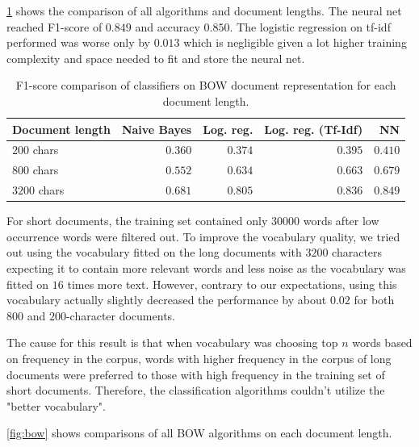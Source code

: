 \cref{tbl:bow_comparison} shows the comparison of all algorithms and document lengths. The neural net reached F1-score of $0.849$ and accuracy $0.850$. The logistic regression on tf-idf performed was worse only by $0.013$ which is negligible given a lot higher training complexity and space needed to fit and store the neural net.

\begin{table}[h]
	\centering
	\begin{tabular}{|l|r|r|r|r|}\hline
		Document length & Naive Bayes & Log. reg. & Log. reg. (Tf-Idf) & NN \\
		\hline
		$200$ chars   & $ 0.360$  &  $0.374$  & $0.395$  &  $0.410$   \\
		$800$ chars   & $0.552$  &  $0.634$  & $0.663$  &  $0.679$   \\
		$3200$ chars  & $0.681$  &  $0.805$  & $0.836$  &  $0.849$   \\
		\hline
	\end{tabular}
	\caption{F1-score comparison of classifiers on BOW document representation for each document length.}
	\label{tbl:bow_comparison}
\end{table}



For short documents, the training set contained only $30000$ words after low occurrence words were filtered out. To improve the vocabulary quality, we tried out using the vocabulary fitted on the long documents with $3200$ characters expecting it to contain more relevant words and less noise as the vocabulary was fitted on $16$ times more text. However, contrary to our expectations, using this vocabulary actually slightly decreased the performance by about $0.02$ for both $800$ and $200$-character documents. 

The cause for this result is that when vocabulary was choosing top $n$ words based on frequency in the corpus, words with higher frequency in the corpus of long documents were preferred to those with high frequency in the training set of short documents. Therefore, the classification algorithms couldn't utilize the "better vocabulary".

\cref{fig:bow} shows comparisons of all BOW algorithms on each document length.


